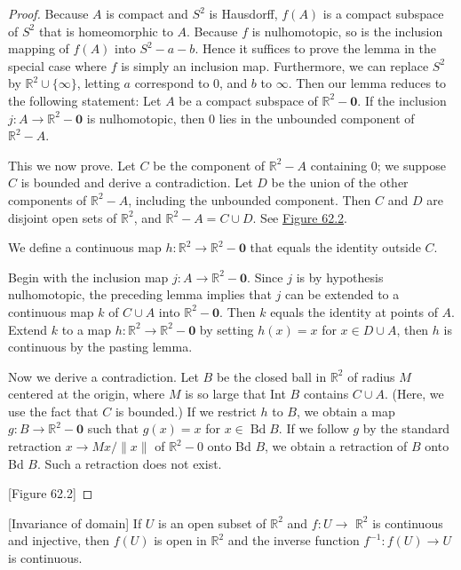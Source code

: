 \begin{proof}
Because \(A\) is compact and \(S^{2}\) is Hausdorff, \(f( A)\) is a compact subspace of \(S^{2}\) that is homeomorphic to \(A\). Because \(f\) is nulhomotopic, so is the inclusion mapping of \(f( A)\) into \(S^{2} - a - b\). Hence it suffices to prove the lemma in the special case where \(f\) is simply an inclusion map. Furthermore, we can replace \(S^{2}\) by \(\mathbb{R}^{2} \cup \{ \infty \}\), letting \(a\) correspond to 0, and \(b\) to \(\infty\). Then our lemma reduces to the following statement:
Let \(A\) be a compact subspace of \(\mathbb{R}^{2} - \mathbf{0}\). If the inclusion \(j : A \rightarrow {\mathbb{R}}^{2} - \mathbf{0}\) is nulhomotopic, then 0 lies in the unbounded component of \(\mathbb{R}^{2} - A\).

This we now prove. Let \(C\) be the component of \(\mathbb{R}^{2} - A\) containing 0; we suppose \(C\) is bounded and derive a contradiction. Let \(D\) be the union of the other components of \(\mathbb{R}^{2} - A\), including the unbounded component. Then \(C\) and \(D\) are disjoint open sets of \(\mathbb{R}^{2}\), and \(\mathbb{R}^{2} - A = C \cup D\). See \hyperref[fig:62.2]{Figure 62.2}.

We define a continuous map \(h : \mathbb{R}^{2} \rightarrow {\mathbb{R}}^{2} - \mathbf{0}\) that equals the identity outside \(C\).

Begin with the inclusion map \(j : A \rightarrow {\mathbb{R}}^{2} - \mathbf{0}\). Since \(j\) is by hypothesis nulhomotopic, the preceding lemma implies that \(j\) can be extended to a continuous map \(k\) of \(C \cup A\) into \(\mathbb{R}^{2} - \mathbf{0}\). Then \(k\) equals the identity at points of \(A\). Extend \(k\) to a map \(h : \mathbb{R}^{2} \rightarrow {\mathbb{R}}^{2} - \mathbf{0}\) by setting \(h(x) = x\) for \(x \in D \cup A\), then \(h\) is continuous by the pasting lemma.

Now we derive a contradiction. Let \(B\) be the closed ball in \(\mathbb{R}^{2}\) of radius \(M\) centered at the origin, where \(M\) is so large that Int \(B\) contains \(C \cup A\). (Here, we use the fact that \(C\) is bounded.) If we restrict \(h\) to \(B\), we obtain a map \(g : B \rightarrow {\mathbb{R}}^{2} - \mathbf{0}\) such that \(g(x) = x\) for \(x \in \operatorname{Bd}B\). If we follow \(g\) by the standard retraction \(x \rightarrow {Mx}/\parallel x\parallel\) of \(\mathbb{R}^{2} - 0\) onto Bd \(B\), we obtain a retraction of \(B\) onto Bd \(B\). Such a retraction does not exist.

[Figure 62.2]
\end{proof}
\begin{theorem}
\label{thm:\thetheorem}[Invariance of domain]
If \(U\) is an open subset of \(\mathbb{R}^{2}\) and \(f : U \rightarrow\) \(\mathbb{R}^{2}\) is continuous and injective, then \(f( U)\) is open in \(\mathbb{R}^{2}\) and the inverse function \(f^{-1} : f( U) \rightarrow U\) is continuous.
\end{theorem}

